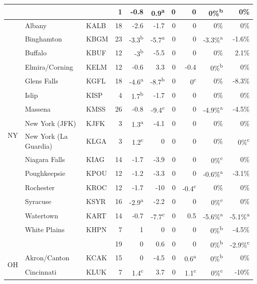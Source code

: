 \documentclass[twocol]{ametsoc}
\begin{document}
\begin{landscape}
\begin{table}[]
\begin{tabular}{@{}cllrrrrrrr@{}}
 &  &  & 1 & -0.8 & 0.9\textsuperscript{a} & 0 & 0 & 0\%\textsuperscript{b} & 0\% \\ \midrule
\multirow{16}{*}{NY} & Albany & KALB & 18 & -2.6 & -1.7 & 0 & 0 & 0\% & 0\% \\
 & Binghamton & KBGM & 23 & -3.3\textsuperscript{b} & -5.7\textsuperscript{a} & 0 & 0 & -3.3\%\textsuperscript{a} & -1.6\% \\
 & Buffalo & KBUF & 12 & -3\textsuperscript{b} & -5.5 & 0 & 0 & 0\% & 2.1\% \\
 & Elmira/Corning & KELM & 12 & -0.6 & 3.3 & 0 & -0.4 & 0\%\textsuperscript{b} & 0\% \\
 & Glens Falls & KGFL & 18 & -4.6\textsuperscript{a} & -8.7\textsuperscript{b} & 0 & 0\textsuperscript{c} & 0\% & -8.3\% \\
 & Islip & KISP & 4 & 1.7\textsuperscript{b} & -1.7 & 0 & 0 & 0\% & 0\% \\
 & Massena & KMSS & 26 & -0.8 & -9.4\textsuperscript{c} & 0 & 0 & -4.9\%\textsuperscript{a} & -4.5\% \\
 & New York (JFK) & KJFK & 3 & 1.3\textsuperscript{a} & -4.1 & 0 & 0 & 0\% & 0\% \\
 & New York (La Guardia) & KLGA & 3 & 1.2\textsuperscript{c} & 0 & 0 & 0 & 0\% & 0\%\textsuperscript{c} \\
 & Niagara Falls & KIAG & 14 & -1.7 & -3.9 & 0 & 0 & 0\%\textsuperscript{c} & 0\% \\
 & Poughkeepsie & KPOU & 12 & -1.2 & -3.3 & 0 & 0 & -0.6\%\textsuperscript{a} & -3.1\% \\
 & Rochester & KROC & 12 & -1.7 & -10 & 0 & -0.4\textsuperscript{c} & 0\% & 0\% \\
 & Syracuse & KSYR & 16 & -2.9\textsuperscript{a} & -2.2 & 0 & 0 & 0\%\textsuperscript{c} & 0\% \\
 & Watertown & KART & 14 & -0.7 & -7.7\textsuperscript{c} & 0 & 0.5 & -5.6\%\textsuperscript{a} & -5.1\%\textsuperscript{a} \\
 & White Plains & KHPN & 7 & 1 & 0 & 0 & 0 & 0\%\textsuperscript{b} & -4.5\% \\ \cmidrule(l){2-10} 
 &  &  & 19 & 0 & 0.6 & 0 & 0 & 0\%\textsuperscript{b} & -2.9\%\textsuperscript{c} \\ \midrule
\multirow{10}{*}{OH} & Akron/Canton & KCAK & 15 & 0 & -4.5 & 0 & 0.6\textsuperscript{a} & 0\%\textsuperscript{b} & 0\% \\
 & Cincinnati & KLUK & 7 & 1.4\textsuperscript{c} & 3.7 & 0 & 1.1\textsuperscript{c} & 0\%\textsuperscript{c} & -10\% \\

\end{tabular}
\end{table}
\end{landscape}
\end{document}
